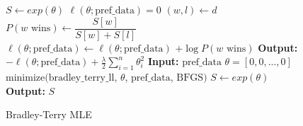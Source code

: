 \begin{wrapfigure}{r}{0.5\textwidth} 
\vspace{-0.3in}
\begin{minipage}{0.5\textwidth}
    \centering
    \begin{algorithm}[H]
    \caption{Bradley-Terry MLE}
    \label{alg:bradley_terry}
    \begin{algorithmic}[1]
        \State $S \gets exp(\theta)$
        \State $\ell(\theta; \text{pref\_data}) = 0$
            \State $(w, l) \gets d$
            \State $P(w \text{ wins}) \gets \dfrac{S[w]}{S[w] + S[l]}$
            \State $\ell(\theta; \text{pref\_data}) \gets \ell(\theta; \text{pref\_data})$ 
\State \hspace{2.2em} $+ \log P(w \text{ wins})$
        \EndFor
        \State \textbf{Output:} $-\ell(\theta; \text{pref\_data}) + \frac{\lambda}{2} \sum_{i=1}^{n} \theta_i^2$
    \EndFunction
    \State
    \State \textbf{Input:} $\text{pref\_data}$
    \State $\theta = [0, 0, ..., 0]$
    \State $\text{minimize}(\text{bradley\_terry\_ll}$, $\theta$, $\text{pref\_data}$, $\text{BFGS})$
    \State $S \gets exp(\theta)$
    \State \textbf{Output:} $S$
    \end{algorithmic}
    \end{algorithm}
\end{minipage}\hfill
\vspace{-0.26in}
\end{wrapfigure}